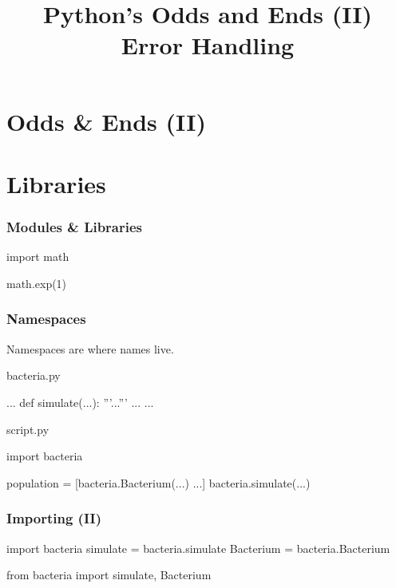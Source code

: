 
\title{Python's Odds and Ends (II)\\Error Handling}

\frame{\maketitle}

\section{Odds \& Ends (II)}

\section{Libraries}

\begin{frame}[fragile]
\frametitle{Modules \& Libraries}
\begin{python}
import math

math.exp(1)
\end{python}
\end{frame}

\begin{frame}[fragile]
\frametitle{Namespaces}
Namespaces are where names live.
\end{frame}

\begin{frame}[fragile]

\begin{block}{bacteria.py}
\begin{python}
...
def simulate(...):
    '''...'''
    ...
...
\end{python}
\end{block}

\begin{block}{script.py}
\begin{python}
import bacteria

population = [bacteria.Bacterium(...) ...]
bacteria.simulate(...)
\end{python}
\end{block}

\end{frame}

\begin{frame}[fragile]
\frametitle{Importing (II)}

\begin{python}
import bacteria
simulate = bacteria.simulate
Bacterium = bacteria.Bacterium
\end{python}

\pause

\begin{python}
from bacteria import simulate, Bacterium
\end{python}

\end{frame}

